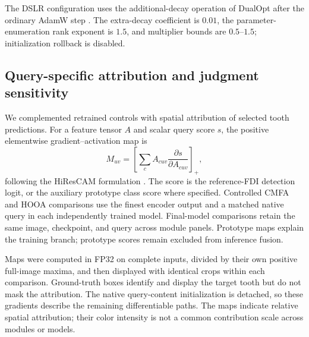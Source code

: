 \documentclass[a4paper,fleqn]{cas-dc}
\begin{document}
The DSLR configuration uses the additional-decay operation of DualOpt after the ordinary AdamW step \citep{ning2026dualopt}. The extra-decay coefficient is $0.01$, the parameter-enumeration rank exponent is $1.5$, and multiplier bounds are $0.5$--$1.5$; initialization rollback is disabled.



\subsection{Query-specific attribution and judgment sensitivity}
\label{sec:visual-methods}

We complemented retrained controls with spatial attribution of selected tooth predictions. For a feature tensor $A$ and scalar query score $s$, the positive elementwise gradient--activation map is
\begin{equation}
 M_{uv}=\left[\sum_c A_{cuv}\frac{\partial s}{\partial A_{cuv}}\right]_+,
 \label{eq:cam}
\end{equation}
following the HiResCAM formulation \citep{draelos2021hirescam}. The score is the reference-FDI detection logit, or the auxiliary prototype class score where specified. Controlled CMFA and HOOA comparisons use the finest encoder output and a matched native query in each independently trained model. Final-model comparisons retain the same image, checkpoint, and query across module panels. Prototype maps explain the training branch; prototype scores remain excluded from inference fusion.

Maps were computed in FP32 on complete inputs, divided by their own positive full-image maxima, and then displayed with identical crops within each comparison. Ground-truth boxes identify and display the target tooth but do not mask the attribution. The native query-content initialization is detached, so these gradients describe the remaining differentiable paths. The maps indicate relative spatial attribution; their color intensity is not a common contribution scale across modules or models.
\end{document}

